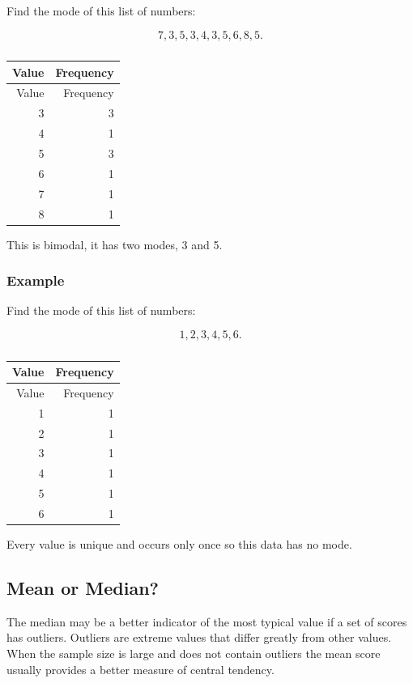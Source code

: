 \documentclass[
]{book}
\begin{document}
Find the mode of this list of numbers:

\[ 7, 3, 5, 3, 4, 3, 5, 6, 8, 5.\]

\begin{longtable}[]{@{}rr@{}}
\caption{\label{tab:table3}}\tabularnewline
\toprule
Value & Frequency \\
\midrule
\endfirsthead
\toprule
Value & Frequency \\
\midrule
\endhead
3 & 3 \\
4 & 1 \\
5 & 3 \\
6 & 1 \\
7 & 1 \\
8 & 1 \\
\bottomrule
\end{longtable}

This is bimodal, it has two modes, 3 and 5.

\hypertarget{example-5}{%
\subsubsection{Example}\label{example-5}}

Find the mode of this list of numbers:

\[ 1, 2, 3, 4, 5, 6.\]

\begin{longtable}[]{@{}rr@{}}
\caption{\label{tab:table4}}\tabularnewline
\toprule
Value & Frequency \\
\midrule
\endfirsthead
\toprule
Value & Frequency \\
\midrule
\endhead
1 & 1 \\
2 & 1 \\
3 & 1 \\
4 & 1 \\
5 & 1 \\
6 & 1 \\
\bottomrule
\end{longtable}

Every value is unique and occurs only once so this data has no mode.

\hypertarget{mean-or-median}{%
\subsection{Mean or Median?}\label{mean-or-median}}

The median may be a better indicator of the most typical value if a set of scores has outliers. Outliers are extreme values that differ greatly from other values. When the sample size is large and does not contain outliers the mean score usually provides a better measure of central tendency.
\end{document}

